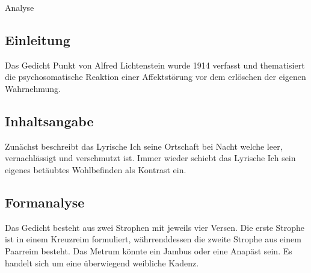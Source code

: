 \documentclass[11pt,a4paper,oneside]{article}
\begin{document}
	\begin{loesung}{Analyse}
		\subsection*{Einleitung}
		Das Gedicht Punkt von Alfred Lichtenstein wurde 1914 verfasst und thematisiert die psychosomatische Reaktion einer Affektstörung vor dem erlöschen der eigenen Wahrnehmung. 
		\\
		\subsection*{Inhaltsangabe}
		Zunächst beschreibt das Lyrische Ich seine Ortschaft bei Nacht welche leer, vernachlässigt und verschmutzt ist. Immer wieder schiebt das Lyrische Ich sein eigenes betäubtes Wohlbefinden als Kontrast ein. 
		\\
		\subsection*{Formanalyse}
		Das Gedicht besteht aus zwei Strophen mit jeweils vier Versen. Die erste Strophe ist in einem Kreuzreim formuliert, währrenddessen die zweite Strophe aus einem Paarreim besteht. Das Metrum könnte ein Jambus oder eine Anapäst sein. Es handelt sich um eine überwiegend weibliche Kadenz.  
		\\

\end{loesung}
\end{document}
